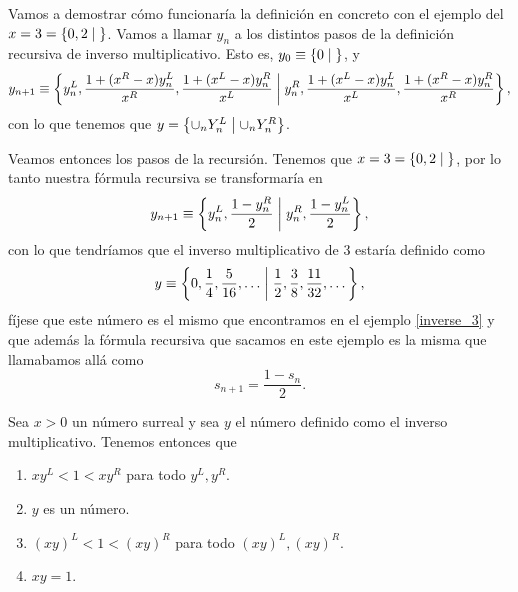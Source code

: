     \begin{example}
        Vamos a demostrar c\'omo funcionar\'ia la definici\'on en concreto con el ejemplo del $x = 3 = \left\{0,2\;\middle|\; \right\}$. Vamos a llamar $y_n$ a los distintos pasos de la definici\'on recursiva de inverso multiplicativo. Esto es, $y_0 \equiv \left\{0\;\middle|\; \right\}$, y 
        \[
            y_{n+1} \equiv \left\{y_n^L, \frac{1+(x^R-x)y_n^L}{x^R}, \frac{1+(x^L-x)y_n^R}{x^L}\;\middle|\; y_n^R, \frac{1+(x^L-x)y_n^L}{x^L}, \frac{1+(x^R-x)y_n^R}{x^R}\right\},
        \]
        con lo que tenemos que $y = \left\{\cup_n Y_n^L\;\middle|\; \cup_n Y_n^R\right\}$. 
        
        Veamos entonces los pasos de la recursi\'on. Tenemos que $x = 3 = \left\{0,2\;\middle|\; \right\}$, por lo tanto nuestra f\'ormula recursiva se transformar\'ia en 
        \[
            y_{n+1} \equiv \left\{y_n^L, \frac{1-y_n^R}{2}\;\middle|\; y_n^R, \frac{1-y_n^L}{2}\right\},
        \]
        con lo que tendr\'iamos que el inverso multiplicativo de $3$ estar\'ia definido como
        \[
            y \equiv \left\{0,\frac{1}{4}, \frac{5}{16}, \dots\;\middle|\; \frac{1}{2}, \frac{3}{8}, \frac{11}{32},\dots\right\},
        \]
        f\'ijese que este n\'umero es el mismo que encontramos en el ejemplo \ref{inverse_3} y que adem\'as la f\'ormula recursiva que sacamos en este ejemplo es la misma que llamabamos all\'a como 
        \[
            s_{n+1} = \frac{1-s_{n}}{2}.
        \]
    \end{example}

    \begin{theorem}
        Sea $x > 0$ un n\'umero surreal y sea $y$ el n\'umero definido como el inverso multiplicativo. Tenemos entonces que
        \begin{enumerate}[nosep]
            \item $xy^L < 1 < xy^R$ para todo $y^L, y^R$.
            \item $y$ es un n\'umero.
            \item $(xy)^L < 1 < (xy)^R$ para todo $(xy)^L, (xy)^R$.
            \item $xy=1$.
        \end{enumerate}
    \end{theorem}

